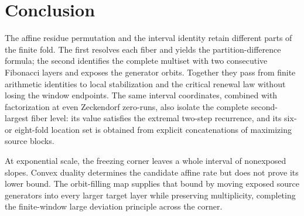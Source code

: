 \section{Conclusion}\label{sec:conclusion}

The affine residue permutation and the interval identity retain different
parts of the finite fold.  The first resolves each fiber and yields the
partition-difference formula; the second identifies the complete multiset
with two consecutive Fibonacci layers and exposes the generator orbits.
Together they pass from finite arithmetic identities to local stabilization
and the critical renewal law without losing the window endpoints.
The same interval coordinates, combined with factorization at even
Zeckendorf zero-runs, also isolate the complete second-largest fiber level:
its value satisfies the extremal two-step recurrence, and its six- or
eight-fold location set is obtained from explicit concatenations of
maximizing source blocks.

At exponential scale, the freezing corner leaves a whole interval of
nonexposed slopes.  Convex duality determines the candidate affine rate but
does not prove its lower bound.  The orbit-filling map supplies that bound by
moving exposed source generators into every larger target layer while
preserving multiplicity, completing the finite-window large deviation
principle across the corner.
